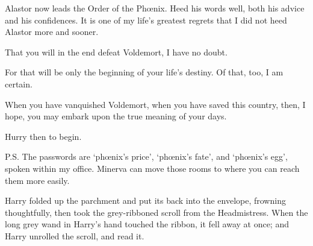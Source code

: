 \begin{writtenNote}
Alastor now leads the Order of the Phœnix. Heed his words well, both his advice and his confidences. It is one of my life’s greatest regrets that I did not heed Alastor more and sooner.

That you will in the end defeat Voldemort, I have no doubt.

For that will be only the beginning of your life’s destiny. Of that, too, I am certain.

When you have vanquished Voldemort, when you have saved this country, then, I hope, you may embark upon the true meaning of your days.

Hurry then to begin.


P.S. The passwords are ‘phœnix’s price’, ‘phœnix’s fate’, and ‘phœnix’s egg’, spoken within my office. Minerva can move those rooms to where you can reach them more easily. \end{writtenNote}

\later

Harry folded up the parchment and put its back into the envelope, frowning thoughtfully, then took the grey-ribboned scroll from the Headmistress. When the long grey wand in Harry’s hand touched the ribbon, it fell away at once; and Harry unrolled the scroll, and read it.

\later

